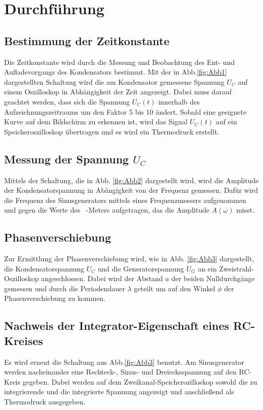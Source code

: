 \section{Durchführung}
\label{sec:Durchführung}

\subsection{Bestimmung der Zeitkonstante}

Die Zeitkonstante wird durch die Messung und Beobachtung des Ent- und Aufladevorgangs des Kondensators bestimmt. 
Mit der in Abb.\ref{fig:Abb1} dargestellten Schaltung wird die am Kondensator gemessene Spannung $U_{C}$ auf einem Oszilloskop in Abhängigkeit der Zeit angezeigt. 
Dabei muss darauf geachtet werden, dass sich die Spannung $U_{C}(t)$ innerhalb des Aufzeichnungszeitraums um den Faktor 5 bis 10 ändert. 
Sobald eine geeignete Kurve auf dem Bildschirm zu erkennen ist, wird das Signal $U_{C}(t)$ auf ein Speicheroszilloskop übertragen und es wird ein Thermodruck erstellt. 

\subsection{Messung der Spannung $U_{C}$}

Mittels der Schaltung, die in Abb. \ref{fig:Abb2} dargestellt wird, wird die Amplitude der Kondensatorspannung in Abängigkeit von der Frequenz gemessen. Dafür wird die Frequenz des Sinusgenerators mittels eines Frequenzmessers aufgenommen und gegen die Werte des \si{\milli\Volt}-Meters aufgetragen, das die Amplitude $A(\omega)$ misst.

\subsection{Phasenverschiebung}

Zur Ermittlung der Phasenverschiebung wird, wie in Abb. \ref{fig:Abb3} dargestellt, die Kondensatorspannung $U_{C}$ und die Generatorspannung $U_{G}$ an ein Zweistrahl-Oszilloskop angeschlossen. 
Dabei wird der Abstand $a$ der beiden Nulldurchgänge gemessen und durch die Periodendauer $\lambda$ geteilt um auf den Winkel $\phi$ der Phasenverschiebung zu kommen. %

\subsection{Nachweis der Integrator-Eigenschaft eines RC-Kreises}

Es wird erneut die Schaltung aus Abb.\ref{fig:Abb3} benutzt. Am Sinusgenerator werden nacheinander eine Rechteck-, Sinus- und Dreiecksspannung auf den RC-Kreis gegeben. Dabei werden auf dem Zweikanal-Speicherozilloskop sowohl die zu integrierende und die integrierte Spannung angezeigt und anschließend als Thermodruck ausgegeben.   
